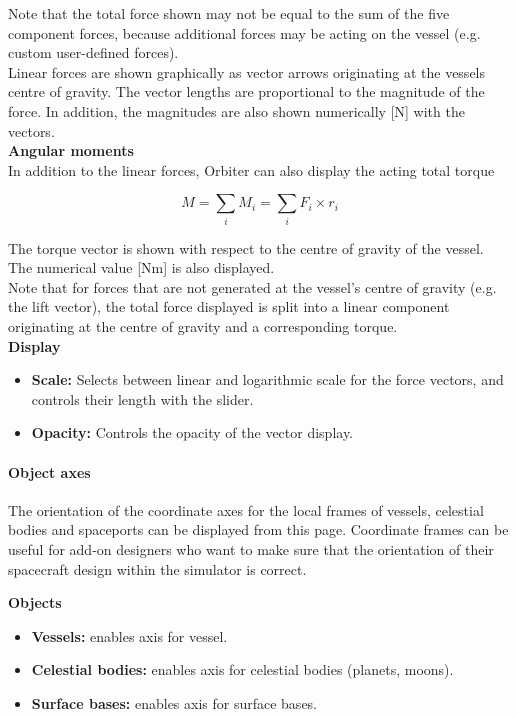 \documentclass[Orbiter User Manual.tex]{subfiles}
\begin{document}
\noindent
Note that the total force shown may not be equal to the sum of the five component forces, because additional forces may be acting on the vessel (e.g. custom user-defined forces).\\
Linear forces are shown graphically as vector arrows originating at the vessels centre of gravity. The vector lengths are proportional to the magnitude of the force. In addition, the magnitudes are also shown numerically [N] with the vectors.\\

\noindent
\textbf{Angular moments}\\
In addition to the linear forces, Orbiter can also display the acting total torque

\[ M = \sum_{i} M_{i}= \sum_{i} F_{i} \times r_{i} \]

\noindent
The torque vector is shown with respect to the centre of gravity of the vessel. The numerical value [Nm] is also displayed.\\
Note that for forces that are not generated at the vessel's centre of gravity (e.g. the lift vector), the total force displayed is split into a linear component originating at the centre of gravity and a corresponding torque.\\

\noindent
\textbf{Display}
\begin{itemize}
\item \textbf{Scale:} Selects between linear and logarithmic scale for the force vectors, and controls their length with the slider.
\item \textbf{Opacity:} Controls the opacity of the vector display.
\end{itemize}


\paragraph{Object axes}
The orientation of the coordinate axes for the local frames of vessels, celestial bodies and spaceports can be displayed from this page. Coordinate frames can be useful for add-on designers who want to make sure that the orientation of their spacecraft design within the simulator is correct.

\begin{figure}[H]
	\centering
\end{figure}

\noindent
\textbf{Objects}
\begin{itemize}
\item \textbf{Vessels:} enables axis for vessel.
\item \textbf{Celestial bodies:} enables axis for celestial bodies (planets, moons).
\item \textbf{Surface bases:} enables axis for surface bases.
\end{itemize}
\end{document}
